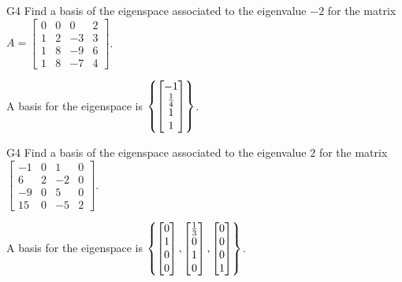 \begin{problem}{G4}
Find a basis of the eigenspace associated to the eigenvalue \(-2\) for the matrix 
\(A=\begin{bmatrix}0 & 0 & 0 & 2 \\ 1 & 2 & -3 & 3 \\ 1 & 8 & -9 & 6 \\ 1 & 8 & -7 & 4\end{bmatrix}\).
\end{problem}
\begin{solution}
A basis for the eigenspace is  \(\left\{\begin{bmatrix} -1 \\ \frac{1}{4} \\ 1 \\ 1 \end{bmatrix}\right\}\).
\end{solution}


\begin{problem}{G4}
Find a basis of the eigenspace associated to the eigenvalue \(2\) for the matrix 
\(\begin{bmatrix} -1 & 0 & 1 & 0 \\ 6 & 2 & -2 & 0 \\ -9 & 0 & 5 & 0 \\ 15 & 0 & -5 & 2 \end{bmatrix}\).
\end{problem}

\begin{solution}
A basis for the eigenspace is  
\(\left\{\begin{bmatrix}0 \\ 1 \\ 0 \\ 0\end{bmatrix},\begin{bmatrix} \frac{1}{3} \\ 0 \\ 1 \\ 0 \end{bmatrix}, \begin{bmatrix} 0 \\ 0 \\ 0 \\ 1\end{bmatrix}\right\}\).
\end{solution}
